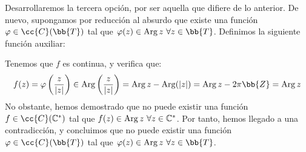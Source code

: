 \begin{ejercicio}
    Desarrollaremos la tercera opción, por ser aquella que difiere de lo anterior. De nuevo, supongamos por reducción al absurdo que existe una función $\varphi\in \cc{C}(\bb{T})$ tal que $\varphi(z)\in \Arg z~\forall z\in \bb{T}$. Definimos la siguiente función auxiliar:

    Tenemos que $f$ es continua, y verifica que:
    \begin{equation*}
        f(z) = \varphi\left(\frac{z}{|z|}\right) \in \Arg\left(\frac{z}{|z|}\right) = \Arg z - \Arg (|z|) = \Arg z - 2\pi\bb{Z} = \Arg z
    \end{equation*}
    No obstante, hemos demostrado que no puede existir una función $f\in \cc{C}(\mathbb{C}^{\ast})$ tal que $f(z)\in \operatorname{Arg} z~\forall z\in \mathbb{C}^{\ast}$. Por tanto, hemos llegado a una contradicción, y concluimos que no puede existir una función $\varphi\in \cc{C}(\bb{T})$ tal que $\varphi(z)\in \Arg z~\forall z\in \bb{T}$.
\end{ejercicio}

